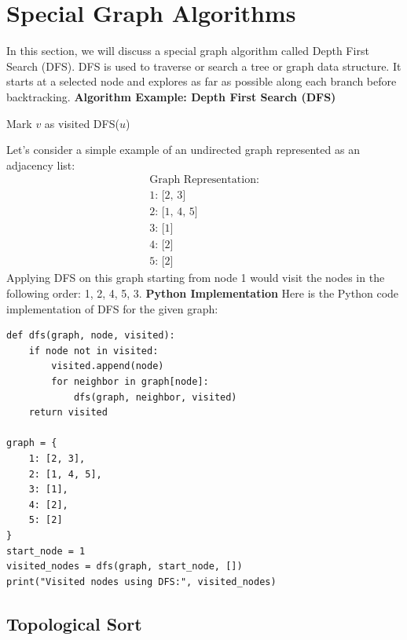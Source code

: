\documentclass[12pt]{book} %
\begin{document}
\section{Special Graph Algorithms}
In this section, we will discuss a special graph algorithm called Depth First Search (DFS). DFS is used to traverse or search a tree or graph data structure. It starts at a selected node and explores as far as possible along each branch before backtracking.
\FloatBarrier
\textbf{Algorithm Example: Depth First Search (DFS)}
\FloatBarrier
\begin{algorithm}
\caption{Depth First Search}
\begin{algorithmic}[1]
\State Mark $v$ as visited
\State DFS($u$)
\EndFor
\EndProcedure
\end{algorithmic}
\end{algorithm}
\FloatBarrier
Let's consider a simple example of an undirected graph represented as an adjacency list:
\FloatBarrier
\begin{equation}
\begin{aligned}
\text{Graph Representation:} \\
\text{1: [2, 3]} \\
\text{2: [1, 4, 5]} \\
\text{3: [1]} \\
\text{4: [2]} \\
\text{5: [2]}
\end{aligned}
\end{equation}
\FloatBarrier
Applying DFS on this graph starting from node 1 would visit the nodes in the following order: 1, 2, 4, 5, 3.
\FloatBarrier
\textbf{Python Implementation}
\FloatBarrier
Here is the Python code implementation of DFS for the given graph:
\FloatBarrier
\begin{lstlisting}
def dfs(graph, node, visited):
    if node not in visited:
        visited.append(node)
        for neighbor in graph[node]:
            dfs(graph, neighbor, visited)
    return visited

graph = {
    1: [2, 3],
    2: [1, 4, 5],
    3: [1],
    4: [2],
    5: [2]
}
start_node = 1
visited_nodes = dfs(graph, start_node, [])
print("Visited nodes using DFS:", visited_nodes)
\end{lstlisting}
\FloatBarrier

\subsection{Topological Sort}
\end{document}
